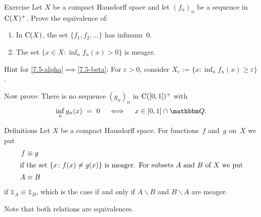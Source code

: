 \documentclass[main.tex]{subfiles}
\begin{document}
%
%
%
\begin{psec}{7.5}{Exercise}
Let $X$ be a compact Hausdorff space
and let $(f_n)_n$ be a sequence in $\mathrm{C}(X)^+$.
Prove the equivalence of:
\begin{enumerate}[label=(\greek*)]
\item\label{7.5-alpha}
In $\mathrm{C}(X)$,
the set $\{ f_1,f_2,\dotsc \}$ has infimum~$0$.
%
\item\label{7.5-beta}
The set $\{x\in X\colon \inf_n f_n(x)>0\}$ is meager.
\end{enumerate}
Hint for \ref{7.5-alpha}$\implies$\ref{7.5-beta}:
For $\varepsilon>0$,
consider $X_\varepsilon :=\{x\colon \inf_n f_n(x)\geq\varepsilon\}$.

Now prove:
There is no sequence $(g_n)_n$ in $\mathrm{C}([0,1])^+$ with
\begin{equation*}
\inf_n g_n(x)\ =\ 0 \quad\iff\quad x\in[0,1]\cap\mathbb{Q}\htam{.}
\end{equation*}
\end{psec}
%
%
\begin{psec}{7.6}{Definitions}
Let $X$ be a compact Hausdorff space.
For functions~$f$ and~$g$ on~$X$ we put
\begin{align*}
f&\equiv g \\
\shortintertext{%
if the set $\{x\colon f(x)\neq g(x)\}$ is meager.
For subsets~$A$ and~$B$ of~$X$
we put}
A&\equiv B
\end{align*}
if $\mathbb{1}_A\equiv\mathbb{1}_B$,
which is the case if and only if $A\backslash B$
and $B\backslash A$ are meager.

Note that both relations are equivalences.
\end{psec}
%
%
%
\clearpage
\end{document}
